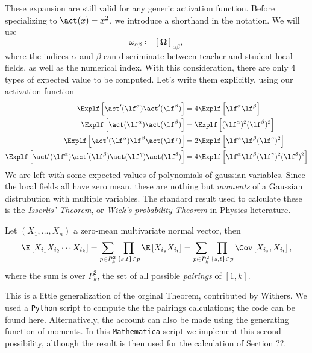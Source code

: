 These expansion are still valid for any generic activation function.
Before specializing to \(\act(x)=x^2\), we introduce a shorthand in the notation.
We will use \[\omega_{\alpha\beta} \coloneqq \left[\bm{\Omega}\right]_{\alpha\beta},\]
where the indices \(\alpha\) and \(\beta\) can discriminate between teacher and student local fields, as well as the numerical index.
With this consideration, there are only 4 types of expected value to be computed.
Let's write them explicitly, using our activation function
\[\begin{split}
  \Explf  \left[\act' (\lf^\alpha)  \act' (\lf^\beta)  \right] &= 
  4 \Explf  \left[\lf^\alpha \lf^\beta \right] \\
  \Explf  \left[\act(\lf^\alpha)  \act(\lf^\beta)  \right] &= 
  \Explf  \left[(\lf^\alpha)^2 (\lf^\beta)^2 \right] \\
  \Explf  \left[\act'(\lf^\alpha) \lf^\beta \act(\lf^\gamma) \right] &= 
  2\Explf  \left[\lf^\alpha \lf^\beta (\lf^\gamma)^2\right] \\
  \Explf  \left[\act'(\lf^\alpha) \act'(\lf^\beta) \act(\lf^\gamma) \act(\lf^\delta) \right] &= 
  4\Explf  \left[\lf^\alpha \lf^\beta (\lf^\gamma)^2 (\lf^\delta)^2\right] \\
\end{split}\]
We are left with some expected values of polynomials of gaussian variables. 
Since the local fields all have zero mean, these are nothing but \emph{moments} 
of a Gaussian distrubution with multiple variables.
The standard result used to calculate these is the \emph{Isserlis' Theorem}, or 
\emph{Wick's probability Theorem} in Physics lieterature.
\begin{theorem}
  Let \((X_1,\dots,X_n)\) a zero-mean multivariate normal vector,
  then
  \[
    \E\left[X_{i_1}X_{i_2}\cdots X_{i_k}\right] =
      \sum_{p\in P^2_k}\prod_{\{s,t\}\in p} \E\left[X_{i_s}X_{i_t}\right] =
      \sum_{p\in P^2_k}\prod_{\{s,t\}\in p} \Cov\left[X_{i_s},X_{i_t}\right],
  \]
  where the sum is over \(P^2_k\), the set of all possible \emph{pairings} of \([1,k]\).
\end{theorem}
This is a little generalization of the orginal Theorem, contributed by Withers\cite{withers1985moments}.
We used a \texttt{Python} script to compute the the pairings calculations;
the code can be found here. %
Alternatively, the account can also be made using the generating function of moments.
In this \texttt{Mathematica} script we implement this second possibility, 
although the result is then used for the calculation of Section ??.

